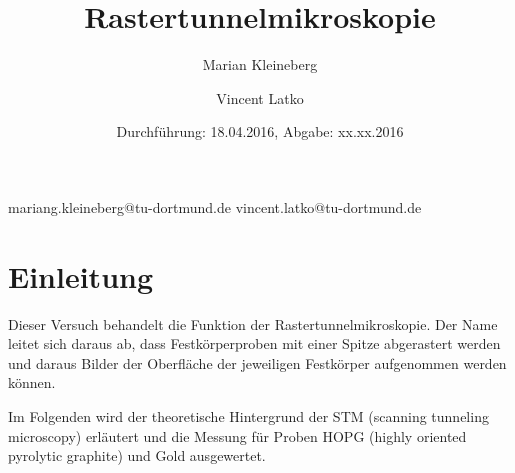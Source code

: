 \documentclass[paper=a4]{scrartcl}
\title{Rastertunnelmikroskopie}
\author{Marian Kleineberg\and Vincent Latko}
\date{Durchführung: 18.04.2016, Abgabe: xx.xx.2016}
\begin{document}
\maketitle
\thispagestyle{empty}
\vfill
mariang.kleineberg@tu-dortmund.de \qquad\qquad\qquad\qquad\qquad\qquad vincent.latko@tu-dortmund.de
\newpage
\tableofcontents
\newpage

\section{Einleitung}
Dieser Versuch behandelt die Funktion der Rastertunnelmikroskopie. Der Name leitet sich daraus ab, dass Festkörperproben mit einer Spitze abgerastert werden und daraus Bilder der Oberfläche der jeweiligen Festkörper aufgenommen werden können.

\noindent Im Folgenden wird der theoretische Hintergrund der STM (scanning tunneling microscopy) erläutert und die Messung für Proben HOPG (highly oriented pyrolytic graphite) und Gold ausgewertet.
\end{document}
